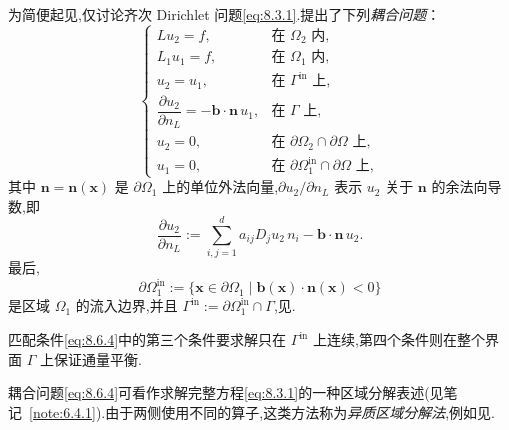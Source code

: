 为简便起见,仅讨论齐次 Dirichlet 问题\eqref{eq:8.3.1}.提出了下列\emph{耦合问题}：
\begin{equation}\label{eq:8.6.4}
  \begin{cases}
    Lu_2=f,&\text{在 }\Omega_2\text{ 内},\\
    L_1u_1=f,&\text{在 }\Omega_1\text{ 内},\\
    u_2=u_1,&\text{在 }\Gamma^{\mathrm{in}}\text{ 上},\\
    \dfrac{\partial u_2}{\partial n_L}=-\boldsymbol{b}\cdot\boldsymbol{n}\,u_1,
          &\text{在 }\Gamma\text{ 上},\\
    u_2=0,&\text{在 }\partial\Omega_2\cap\partial\Omega\text{ 上},\\
    u_1=0,&\text{在 }\partial\Omega_1^{\mathrm{in}}\cap\partial\Omega\text{ 上},
  \end{cases}
\end{equation}
其中 \(\boldsymbol{n}=\boldsymbol{n}(\boldsymbol{x})\) 是 \(\partial\Omega_1\) 上的单位外法向量,\(\partial u_2/\partial n_L\) 表示 \(u_2\) 关于 \(\boldsymbol{n}\) 的余法向导数,即
\[
  \frac{\partial u_2}{\partial n_L}
     :=\sum_{i,j=1}^d a_{ij}D_ju_2\,n_i-\boldsymbol{b}\cdot\boldsymbol{n}\,u_2.
\]
最后,
\[
  \partial\Omega_1^{\mathrm{in}}
    :=\{\boldsymbol{x}\in\partial\Omega_1\mid \boldsymbol{b}(\boldsymbol{x})\cdot\boldsymbol{n}(\boldsymbol{x})<0\}
\]
是区域 \(\Omega_1\) 的流入边界,并且 \(\Gamma^{\mathrm{in}}:=\partial\Omega_1^{\mathrm{in}}\cap\Gamma\),见.

匹配条件\eqref{eq:8.6.4}中的第三个条件要求解只在 \(\Gamma^{\mathrm{in}}\) 上连续,第四个条件则在整个界面 \(\Gamma\) 上保证通量平衡.

耦合问题\eqref{eq:8.6.4}可看作求解完整方程\eqref{eq:8.3.1}的一种区域分解表述(见笔记~\ref{note:6.4.1}).由于两侧使用不同的算子,这类方法称为\emph{异质区域分解法},例如见.

